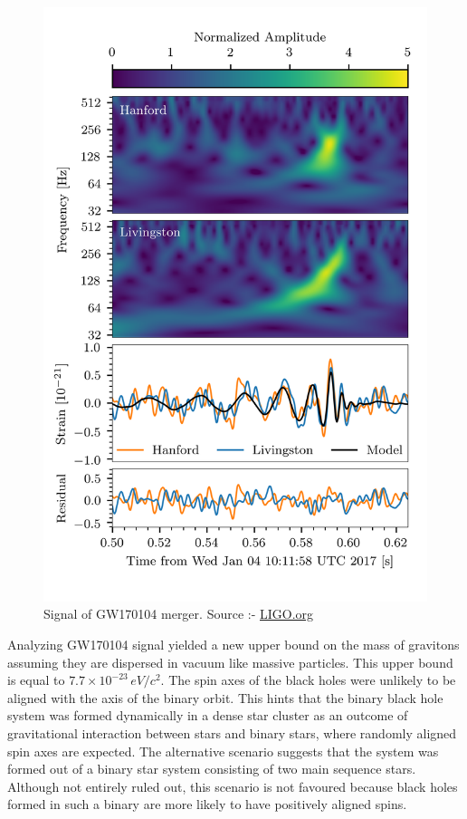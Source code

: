 \begin{figure}[h]
    \centering
    \includegraphics[scale=1.2]{images.tex/GW170104.png}
    \caption{Signal of GW170104 merger. Source :- \href{https://www.ligo.org/science/Publication-GW170104/}{LIGO.org}}
\end{figure}

Analyzing GW170104 signal yielded a new upper bound on the mass of gravitons assuming they are dispersed in vacuum like massive particles. This upper bound is equal to $7.7\times10^{-23} \, eV/c^2$. The spin axes of the black holes were unlikely to be aligned with the axis of the binary orbit. This hints that the binary black hole system was formed dynamically in a dense star cluster as an outcome of gravitational interaction between stars and binary stars, where randomly aligned spin axes are expected. The alternative scenario suggests that the system was formed out of a binary star system consisting of two main sequence stars. Although not entirely ruled out, this scenario is not favoured because black holes formed in such a binary are more likely to have positively aligned spins.

\pagebreak
